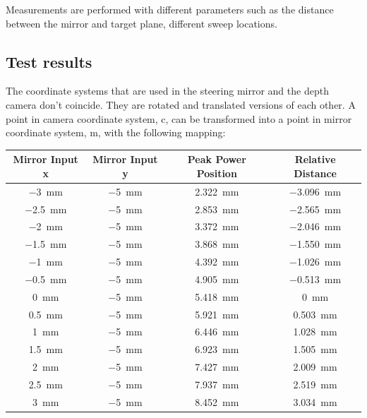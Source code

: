 Measurements are performed with different parameters such as the distance
between the mirror and target plane, different sweep locations.


\subsection{Test results }
\label{subsec:test_results}

The coordinate systems that are used in the steering
mirror and the depth camera don't coincide. They are
rotated and translated versions of each other. A point
in camera coordinate system, c, can be transformed into
a point in mirror coordinate system, m, with the following mapping:


\begin{table}[ht]
    \centering
    \begin{tabular}{| c | c | c | c |} %
        \hline Mirror Input x & Mirror Input y & Peak Power Position & Relative Distance \\ \hline %
        \SI{-3}{mm}           & \SI{-5}{mm}    & \SI{2.322}{mm}      & \SI{-3.096}{mm}   \\
        \SI{-2.5}{mm}         & \SI{-5}{mm}    & \SI{2.853}{mm}      & \SI{-2.565}{mm}   \\
        \SI{-2}{mm}           & \SI{-5}{mm}    & \SI{3.372}{mm}      & \SI{-2.046}{mm}   \\
        \SI{-1.5}{mm}         & \SI{-5}{mm}    & \SI{3.868}{mm}      & \SI{-1.550}{mm}   \\
        \SI{-1}{mm}           & \SI{-5}{mm}    & \SI{4.392}{mm}      & \SI{-1.026}{mm}   \\
        \SI{-0.5}{mm}         & \SI{-5}{mm}    & \SI{4.905}{mm}      & \SI{-0.513}{mm}   \\
        \SI{0}{mm}            & \SI{-5}{mm}    & \SI{5.418}{mm}      & \SI{0}{mm}        \\
        \SI{0.5}{mm}          & \SI{-5}{mm}    & \SI{5.921}{mm}      & \SI{0.503}{mm}    \\
        \SI{1}{mm}            & \SI{-5}{mm}    & \SI{6.446}{mm}      & \SI{1.028}{mm}    \\
        \SI{1.5}{mm}          & \SI{-5}{mm}    & \SI{6.923}{mm}      & \SI{1.505}{mm}    \\
        \SI{2}{mm}            & \SI{-5}{mm}    & \SI{7.427}{mm}      & \SI{2.009}{mm}    \\
        \SI{2.5}{mm}          & \SI{-5}{mm}    & \SI{7.937}{mm}      & \SI{2.519}{mm}    \\
        \SI{3}{mm}            & \SI{-5}{mm}    & \SI{8.452}{mm}      & \SI{3.034}{mm}    \\


\end{tabular}
\end{table}
